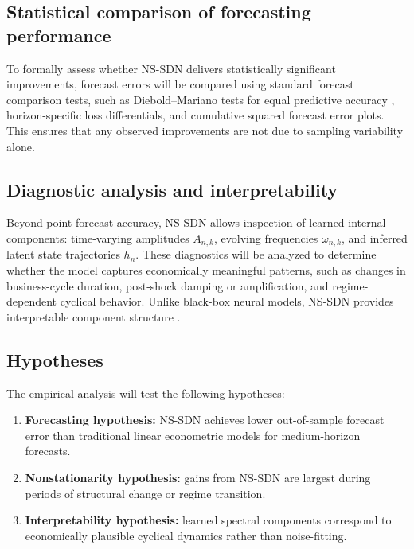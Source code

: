 \subsection{Statistical comparison of forecasting performance}
To formally assess whether NS-SDN delivers statistically significant improvements, forecast errors will be compared using standard forecast comparison tests, such as Diebold--Mariano tests for equal predictive accuracy \citep{diebold1995}, horizon-specific loss differentials, and cumulative squared forecast error plots. This ensures that any observed improvements are not due to sampling variability alone.

\subsection{Diagnostic analysis and interpretability}
Beyond point forecast accuracy, NS-SDN allows inspection of learned internal components: time-varying amplitudes $A_{n,k}$, evolving frequencies $\omega_{n,k}$, and inferred latent state trajectories $h_n$. These diagnostics will be analyzed to determine whether the model captures economically meaningful patterns, such as changes in business-cycle duration, post-shock damping or amplification, and regime-dependent cyclical behavior. Unlike black-box neural models, NS-SDN provides interpretable component structure \citep{oreshkin2020,lim2021}.

\subsection{Hypotheses}
The empirical analysis will test the following hypotheses:
\begin{enumerate}
\item \textbf{Forecasting hypothesis:} NS-SDN achieves lower out-of-sample forecast error than traditional linear econometric models for medium-horizon forecasts.
\item \textbf{Nonstationarity hypothesis:} gains from NS-SDN are largest during periods of structural change or regime transition.
\item \textbf{Interpretability hypothesis:} learned spectral components correspond to economically plausible cyclical dynamics rather than noise-fitting.
\end{enumerate}
